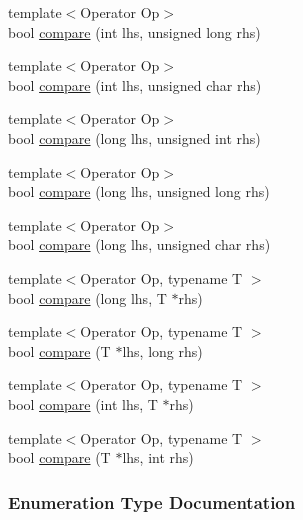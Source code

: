 \begin{DoxyCompactItemize}
\item 
{\footnotesize template$<$Operator Op$>$ }\\bool \hyperlink{a00120_aac7a6452ed0d324031ceb7b4f3a3b61c}{compare} (int lhs, unsigned long rhs)
\item 
{\footnotesize template$<$Operator Op$>$ }\\bool \hyperlink{a00120_a7e82d987f62b9822107027c72a55fa6b}{compare} (int lhs, unsigned char rhs)
\item 
{\footnotesize template$<$Operator Op$>$ }\\bool \hyperlink{a00120_a0b4783ede1901e5c1baf8ff909bcce8d}{compare} (long lhs, unsigned int rhs)
\item 
{\footnotesize template$<$Operator Op$>$ }\\bool \hyperlink{a00120_ae9aec44a08d9cbb0d3dd46d438b50d2c}{compare} (long lhs, unsigned long rhs)
\item 
{\footnotesize template$<$Operator Op$>$ }\\bool \hyperlink{a00120_a79664b5f5f497fba57bd156e098de1f2}{compare} (long lhs, unsigned char rhs)
\item 
{\footnotesize template$<$Operator Op, typename T $>$ }\\bool \hyperlink{a00120_a829570ad9e724c687aa42190a696032b}{compare} (long lhs, T $\ast$rhs)
\item 
{\footnotesize template$<$Operator Op, typename T $>$ }\\bool \hyperlink{a00120_a3f89c65fdb06aa7b648c5acf0ca107a9}{compare} (T $\ast$lhs, long rhs)
\item 
{\footnotesize template$<$Operator Op, typename T $>$ }\\bool \hyperlink{a00120_a4f30c29e4adb62c7e209e5b988e59397}{compare} (int lhs, T $\ast$rhs)
\item 
{\footnotesize template$<$Operator Op, typename T $>$ }\\bool \hyperlink{a00120_a95361ddae55c9a390e6510bdadccb1fc}{compare} (T $\ast$lhs, int rhs)
\end{DoxyCompactItemize}


\subsubsection{Enumeration Type Documentation}
\hypertarget{a00120_ae3f96598a7858155750bf38e7295d83e}{}

